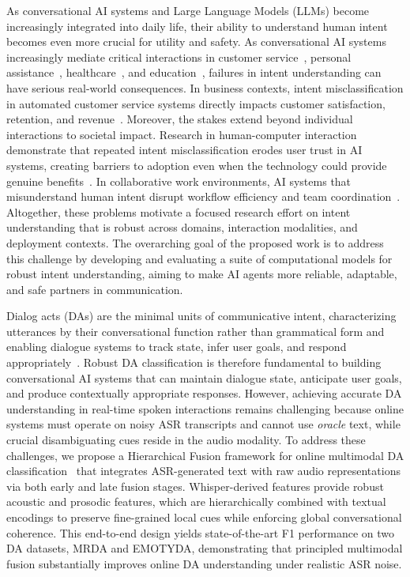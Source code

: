 As conversational AI systems and Large Language Models (LLMs) become increasingly integrated into daily life, their ability to understand human intent becomes even more crucial for utility and safety. As conversational AI systems increasingly mediate critical interactions in customer service~\cite{chatbots_AI}, personal assistance~\cite{VoiceAssistants}, healthcare~\cite{ConversationalHealthcare}, and education~\cite{ChatbotsEducation}, failures in intent understanding can have serious real-world consequences. In business contexts, intent misclassification in automated customer service systems directly impacts customer satisfaction, retention, and revenue~\cite{Chung2018}. Moreover, the stakes extend beyond individual interactions to societal impact. Research in human-computer interaction demonstrate that repeated intent misclassification erodes user trust in AI systems, creating barriers to adoption even when the technology could provide genuine benefits~\cite{Khadpe2020, Bansal2019}. In collaborative work environments, AI systems that misunderstand human intent disrupt workflow efficiency and team coordination~\cite{Seeber2020}. Altogether, these problems motivate a focused research effort on intent understanding that is robust across domains, interaction modalities, and deployment contexts. The overarching goal of the proposed work is to address this challenge by developing and evaluating a suite of computational models for robust intent understanding, aiming to make AI agents more reliable, adaptable, and safe partners in communication.

Dialog acts (DAs) are the minimal units of communicative intent, characterizing utterances by their conversational function rather than grammatical form and enabling dialogue systems to track state, infer user goals, and respond appropriately~\cite{Searle1969, Bunt2000, Stolcke2000}. Robust DA classification is therefore fundamental to building conversational AI systems that can maintain dialogue state, anticipate user goals, and produce contextually appropriate responses. However, achieving accurate DA understanding in real-time spoken interactions remains challenging because online systems must operate on noisy ASR transcripts and cannot use \textit{oracle} text, while crucial disambiguating cues reside in the audio modality. To address these challenges, we propose a Hierarchical Fusion framework for online multimodal DA classification~\cite{MiahDA} that integrates ASR-generated text with raw audio representations via both early and late fusion stages. Whisper-derived features provide robust acoustic and prosodic features, which are hierarchically combined with textual encodings to preserve fine-grained local cues while enforcing global conversational coherence. This end-to-end design yields state-of-the-art F1 performance on two DA datasets, MRDA and EMOTYDA, demonstrating that principled multimodal fusion substantially improves online DA understanding under realistic ASR noise.

